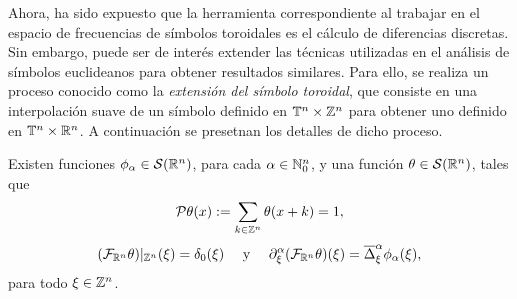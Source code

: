 Ahora, ha sido expuesto que la herramienta correspondiente al trabajar en el espacio de frecuencias de símbolos toroidales es el cálculo de diferencias discretas. Sin embargo, puede ser de interés extender las técnicas utilizadas en el análisis de símbolos euclideanos para obtener resultados similares. Para ello, se realiza un proceso conocido como la \textit{extensión del símbolo toroidal}, que consiste en una interpolación suave de un símbolo definido en $\mathbb{T}^n\times\mathbb{Z}^n$ para obtener uno definido en $\mathbb{T}^n\times\mathbb{R}^n$. A continuación se presetnan los detalles de dicho proceso. 
\begin{lemma}\label{lem:aux-extension}
	Existen funciones $\phi_\alpha\in\mathcal{S}(\mathbb{R}^n)$, para cada $\alpha\in\mathbb{N}_0^n$, y una función $\theta\in\mathcal{S}(\mathbb{R}^n)$, tales que 
	\begin{equation*}
		\mathcal{P}\theta(x) := \sum_{k\in\mathbb{Z}^n}\theta(x+k) = 1,
	\end{equation*}
	\begin{equation*}
		(\mathcal{F}_{\mathbb{R}^n}\theta)|_{\mathbb{Z}^n}(\xi) = \delta_0(\xi) \quad \text{ y } \quad \partial^\alpha_\xi (\mathcal{F}_{\mathbb{R}^n}\theta)(\xi) = \overline{\Delta}^\alpha_\xi \phi_\alpha(\xi),
	\end{equation*}
	para todo $\xi\in\mathbb{Z}^n$.
\end{lemma}
